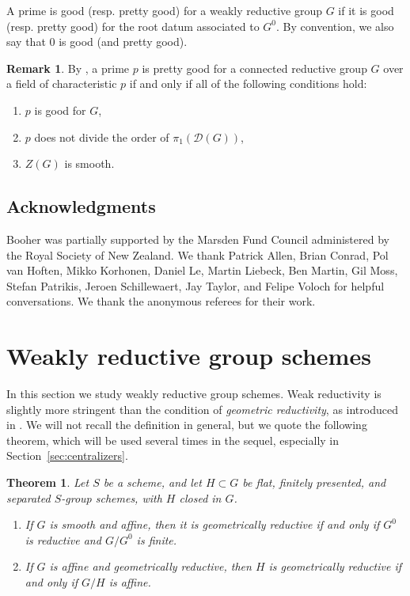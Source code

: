 \documentclass[11pt, letterpaper,english]{amsart}
\theoremstyle{plain}
\newtheorem{theorem}[lem]{Theorem}
\theoremstyle{definition}
\newtheorem{remark}[lem]{Remark}
\numberwithin{equation}{section}
\numberwithin{lem}{section}
\newcommand{\sD}{{\mathscr D}}
\begin{document}
A prime is good (resp. pretty good) for a weakly reductive group $G$ if it is good (resp. pretty good) for the root datum associated to $G^0$.   By convention, we also say that $0$ is good (and pretty good).

\begin{remark} \label{rmk:pretty good}
By \cite[Lemma 2.2]{cotner}, a prime $p$ is pretty good for a connected reductive group $G$ over a field of characteristic $p$ if and only if all of the following conditions hold:
\begin{enumerate}
    \item $p$ is good for $G$,
    \item $p$ does not divide the order of $\pi_1(\sD(G))$,
    \item $Z(G)$ is smooth.
\end{enumerate}
\end{remark}

\subsection{Acknowledgments}  Booher was partially supported by the Marsden Fund Council administered by the Royal Society of New Zealand.  We thank
Patrick Allen,
Brian Conrad,
Pol van Hoften,
Mikko Korhonen,
Daniel Le,
Martin Liebeck, 
Ben Martin,
Gil Moss,
Stefan Patrikis,
Jeroen Schillewaert,
Jay Taylor, and
Felipe Voloch
for helpful conversations.  We thank the anonymous referees for their work.

\section{Weakly reductive group schemes} \label{sec:weaklyreductive}

In this section we study weakly reductive group schemes. Weak reductivity is slightly more stringent than the condition of \emph{geometric reductivity}, as introduced in \cite[Definition 9.1.1]{Alper-adequate}. We will not recall the definition in general, but we quote the following theorem, which will be used several times in the sequel, especially in Section~\ref{sec:centralizers}.

\begin{theorem}\label{theorem:alper}\cite[Theorems 9.4.1, 9.7.6]{Alper-adequate}
Let $S$ be a scheme, and let $H \subset G$ be flat, finitely presented, and separated $S$-group schemes, with $H$ closed in $G$.
\begin{enumerate}
    \item If $G$ is smooth and affine, then it is geometrically reductive if and only if $G^0$ is reductive and $G/G^0$ is finite.
    \item If $G$ is affine and geometrically reductive, then $H$ is geometrically reductive if and only if $G/H$ is affine.
\end{enumerate}
\end{theorem}
\end{document}
